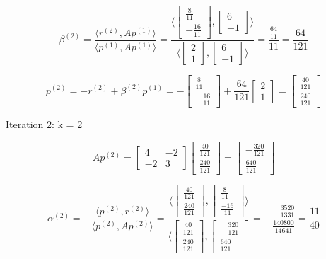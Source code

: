 \documentclass[12pt]{article}
\begin{document}
\begin{enumerate}
\[ \beta^{(2)} = \frac{\langle r^{(2)}, Ap^{(1)} \rangle}{\langle p^{(1)}, Ap^{(1)}\rangle} = \frac{\langle \begin{bmatrix}
\frac{8}{11} \\
-\frac{16}{11}
\end{bmatrix}, \begin{bmatrix}
6 \\
-1
\end{bmatrix}\rangle}{\langle \begin{bmatrix}
2 \\
1
\end{bmatrix}, \begin{bmatrix}
6 \\
-1
\end{bmatrix}\rangle} = \frac{\frac{64}{11}}{11} = \frac{64}{121}\]

\[p^{(2)} = -r^{(2)} + \beta^{(2)}p^{(1)} = -\begin{bmatrix}
\frac{8}{11} \\
-\frac{16}{11}
\end{bmatrix} + \frac{64}{121} \begin{bmatrix}
2 \\
1
\end{bmatrix} = \begin{bmatrix}
\frac{40}{121} \\
\frac{240}{121}
\end{bmatrix}\]

Iteration 2: k = 2

\[ Ap^{(2)} = \begin{bmatrix}
4 & -2 \\
-2 & 3
\end{bmatrix}
\begin{bmatrix}
\frac{40}{121} \\
\frac{240}{121}
\end{bmatrix} = \begin{bmatrix}
-\frac{320}{121} \\
\frac{640}{121}
\end{bmatrix}\]

\[\alpha^{(2)} = - \frac{\langle p^{(2)} , r^{(2)} \rangle}{\langle p^{(2)}, Ap^{(2)}\rangle} = \frac{\langle \begin{bmatrix}
\frac{40}{121} \\
\frac{240}{121}
\end{bmatrix}, \begin{bmatrix}
\frac{8}{11} \\
\frac{-16}{11}
\end{bmatrix} \rangle}{\langle \begin{bmatrix}
\frac{40}{121} \\
\frac{240}{121}
\end{bmatrix}, \begin{bmatrix}
-\frac{320}{121} \\
\frac{640}{121}
\end{bmatrix}} = - \frac{-\frac{3520}{1331}}{\frac{140800}{14641}} = \frac{11}{40} \]


\end{enumerate}
\end{document}
